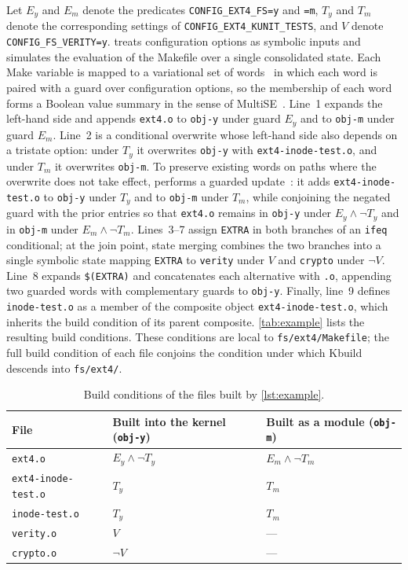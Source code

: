 \documentclass[acmsmall,screen,review,anonymous,nonacm]{acmart}
\begin{document}
  Let $E_y$ and $E_m$ denote the predicates \texttt{CONFIG\_EXT4\_FS=y} and \texttt{=m}, $T_y$ and $T_m$ denote the corresponding settings of \texttt{CONFIG\_\allowbreak EXT4\_\allowbreak KUNIT\_\allowbreak TESTS}, and $V$ denote \texttt{CONFIG\_FS\_VERITY=y}.
  \tool{} treats configuration options as symbolic inputs and simulates the evaluation of the Makefile over a single consolidated state.
  Each Make variable is mapped to a variational set of words~\cite{walkingshaw2014variational} in which each word is paired with a guard over configuration options, so the membership of each word forms a Boolean value summary in the sense of MultiSE~\cite{sen2015multise}.
  Line~1 expands the left-hand side and appends \texttt{ext4.o} to \texttt{obj-y} under guard $E_y$ and to \texttt{obj-m} under guard $E_m$.
  Line~2 is a conditional overwrite whose left-hand side also depends on a tristate option: under $T_y$ it overwrites \texttt{obj-y} with \texttt{ext4-inode-test.o}, and under $T_m$ it overwrites \texttt{obj-m}.
  To preserve existing words on paths where the overwrite does not take effect, \tool{} performs a guarded update~\cite{sen2015multise,gazzillo2017kmax}: it adds \texttt{ext4-inode-test.o} to \texttt{obj-y} under $T_y$ and to \texttt{obj-m} under $T_m$, while conjoining the negated guard with the prior entries so that \texttt{ext4.o} remains in \texttt{obj-y} under $E_y \land \neg T_y$ and in \texttt{obj-m} under $E_m \land \neg T_m$.
  Lines~3--7 assign \texttt{EXTRA} in both branches of an \texttt{ifeq} conditional; at the join point, state merging combines the two branches into a single symbolic state mapping \texttt{EXTRA} to \texttt{verity} under $V$ and \texttt{crypto} under $\neg V$.
  Line~8 expands \texttt{\$(EXTRA)} and concatenates each alternative with \texttt{.o}, appending two guarded words with complementary guards to \texttt{obj-y}.
  Finally, line~9 defines \texttt{inode-test.o} as a member of the composite object \texttt{ext4-inode-test.o}, which inherits the build condition of its parent composite.
  \autoref{tab:example} lists the resulting build conditions.
  These conditions are local to \texttt{fs/ext4/Makefile}; the full build condition of each file conjoins the condition under which Kbuild descends into \texttt{fs/ext4/}.

  \begin{table}[t]
  \centering\footnotesize
  \caption{Build conditions of the files built by \autoref{lst:example}.}
  \label{tab:example}
  \begin{tabular}{lll}
  \toprule
  File & Built into the kernel (\texttt{obj-y}) & Built as a module (\texttt{obj-m}) \\
  \midrule
  \texttt{ext4.o} & $E_y \land \neg T_y$ & $E_m \land \neg T_m$ \\
  \texttt{ext4-inode-test.o} & $T_y$ & $T_m$ \\
  \texttt{inode-test.o} & $T_y$ & $T_m$ \\
  \texttt{verity.o} & $V$ & --- \\
  \texttt{crypto.o} & $\neg V$ & --- \\
  \bottomrule
  \end{tabular}
  \end{table}
\end{document}
